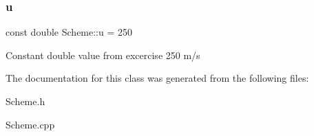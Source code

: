 \subsubsection{\texorpdfstring{u}{u}}
{\footnotesize\ttfamily const double Scheme\+::u = 250\hspace{0.3cm}{\ttfamily [protected]}}

Constant double value from excercise 250 m/s 

The documentation for this class was generated from the following files\+:\begin{DoxyCompactItemize}
\item 
Scheme.\+h\item 
Scheme.\+cpp\end{DoxyCompactItemize}
